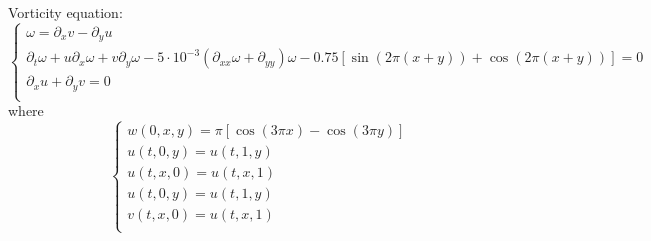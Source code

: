\documentclass{article}
\begin{document}
\begin{enumerate}[label={[\arabic*]}]
\item{Vorticity equation: 
\[\left\{ \begin{array}{llllllll}
\omega=\partial_x v - \partial_y u\\
\partial_t \omega + u \partial_x \omega+ v\partial_y \omega-5\cdot10^{-3}(\partial_{xx}\omega+\partial_{yy})\omega-0.75 \left[\sin\left(2\pi(x+y)\right)+\cos\left(2\pi(x+y)\right)\right]=0\\
\partial_x u+ \partial_y v=0\\
\end{array}
\right.\]
where 
\[\left\{
\begin{array}{lllll}
w(0,x,y)=\pi\left[\cos(3\pi x)-\cos(3\pi y)\right]\\
u(t,0,y)=u(t,1,y)\\
u(t,x,0)=u(t,x,1)\\
u(t,0,y)=u(t,1,y)\\
v(t,x,0)=u(t,x,1)\\
\end{array}
\right.\]\label{eq:Vorticity}}

\end{enumerate}
\end{document}

